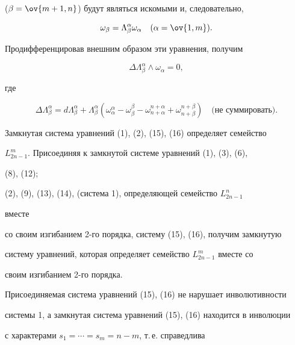 ($\beta=\ov{m+1,n}$) будут являться искомыми и, следовательно, 


\begin{equation} 


\omega_\beta=\Lambda^\alpha_\beta\omega_\alpha\quad 


(\alpha=\ov{1,m}). 


\end{equation} 


Продифференцировав внешним образом эти уравнения, получим 


\begin{equation} 


\Delta\Lambda^\alpha_\beta\wedge\omega_\alpha=0, 


\end{equation} 


где 


$$ 


\Delta\Lambda^\alpha_\beta=d\Lambda^\alpha_\beta+ 


\Lambda^\alpha_\beta(\omega^\alpha_\alpha-\omega^\beta_\beta- 


\omega^{n+\alpha}_{n+\alpha}+\omega^{n+\beta}_{n+\beta})\quad 


\text{(не суммировать)}. 


$$ 


 


Замкнутая система уравнений (1), (2), (15), (16) определяет семейство 


$L^m_{2n-1}$. Присоединяя к замкнутой системе уравнений (1), (3), (6), 


(8), (12); 


(2), (9), (13), (14), (система 1), определяющей семейство $L^n_{2n-1}$ 


вместе 


со своим изгибанием 2-го порядка, систему (15), (16), получим замкнутую 


систему уравнений, которая определяет семейство $L^m_{2n-1}$ вместе со 


своим изгибанием 2-го порядка. 


 


Присоединяемая система уравнений (15), (16) не нарушает инволютивности 


системы 1, а замкнутая система уравнений (15), (16) находится в инволюции 


с характерами $s_1=\dotsb=s_m=n-m$, т.\,е. справедлива 


